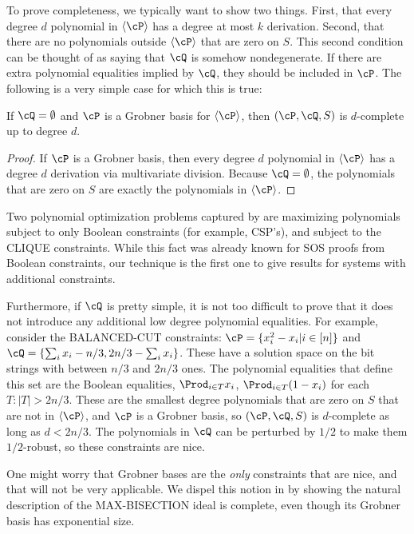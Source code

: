 To prove completeness, we typically want to show two things. First, that every degree $d$ polynomial in $\langle \cP\rangle$ has a degree at most $k$ derivation. Second, that there are no polynomials outside $\langle \cP\rangle$ that are zero on $S$. This second condition can be thought of as saying that $\cQ$ is somehow nondegenerate. If there are extra polynomial equalities implied by $\cQ$, they should be included in $\cP$. The following is a very simple case for which this is true:
\begin{lemma}\label{lem:grobner}
If $\cQ = \emptyset$ and $\cP$ is a Grobner basis for $\langle \cP\rangle$, then $(\cP,\cQ,S)$ is $d$-complete up to degree $d$. 
\end{lemma}
\begin{proof}
If $\cP$ is a Grobner basis, then every degree $d$ polynomial in $\langle \cP\rangle$ has a degree $d$ derivation via multivariate division. Because $\cQ = \emptyset$, the polynomials that are zero on $S$ are exactly the polynomials in $\langle \cP\rangle$. 
\end{proof}
Two polynomial optimization problems captured by  are maximizing polynomials subject to only Boolean constraints (for example, CSP's), and subject to the CLIQUE constraints. While this fact was already known for SOS proofs from Boolean constraints, our technique is the first one to give results for systems with additional constraints. 

Furthermore, if $\cQ$ is pretty simple, it is not too difficult to prove that it does not introduce any additional low degree polynomial equalities. For example, consider the BALANCED-CUT constraints: $\cP = \{x_i^2-x_i | i \in [n]\}$ and $\cQ = \{\sum_i x_i - n/3, 2n/3 - \sum_i x_i\}$. These have a solution space on the bit strings with between $n/3$ and $2n/3$ ones. The polynomial equalities that define this set are the Boolean equalities, $\Prod_{i \in T} x_i$, $\Prod_{i \in T} (1-x_i)$ for each $T: |T| > 2n/3$. These are the smallest degree polynomials that are zero on $S$ that are not in $\langle \cP\rangle$, and $\cP$ is a Grobner basis, so $(\cP, \cQ, S)$ is $d$-complete as long as $d < 2n/3$. The polynomials in $\cQ$ can be perturbed by $1/2$ to make them $1/2$-robust, so these constraints are nice. 

One might worry that Grobner bases are the \emph{only} constraints that are nice, and that  will not be very applicable. We dispel this notion in  by showing the natural description of the MAX-BISECTION ideal is complete, even though its Grobner basis has exponential size.

